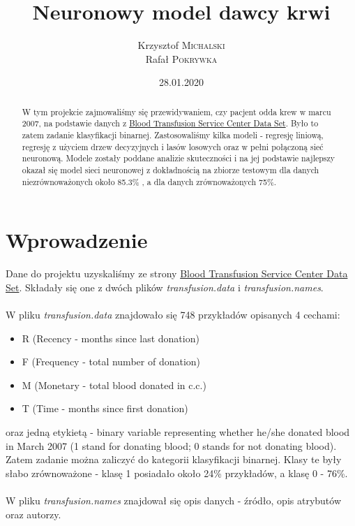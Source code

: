 \documentclass[11pt, a4paper, notitlepage]{report}
\author{Krzysztof \textsc{Michalski} \\ Rafał \textsc{Pokrywka} }
\title{\textbf{Neuronowy model dawcy krwi}}
\date{28.01.2020}
\begin{document}
\clearpage\maketitle
\thispagestyle{empty}
\begin{abstract}
	W tym projekcie zajmowaliśmy się przewidywaniem, czy pacjent odda krew w marcu 2007, na podstawie danych z \href{https://archive.ics.uci.edu/ml/datasets/Blood+Transfusion+Service+Center/}{Blood Transfusion Service Center Data Set}.
	Było to zatem zadanie klasyfikacji binarnej. Zastosowaliśmy kilka modeli - regresję liniową, regresję z użyciem drzew decyzyjnych i lasów losowych oraz w pełni połączoną sieć neuronową. Modele zostały poddane analizie skuteczności i na jej podstawie
	najlepszy okazał się model sieci neuronowej z dokładnością na zbiorze testowym dla danych niezrównoważonych około 85.3\% , a dla danych zrównoważonych 75\%.
\end{abstract}

\clearpage \tableofcontents
\thispagestyle{empty}

\setcounter{page}{1}

\chapter{Wprowadzenie}
	Dane do projektu uzyskaliśmy ze strony \href{https://archive.ics.uci.edu/ml/datasets/Blood+Transfusion+Service+Center/}{Blood Transfusion Service Center Data Set}. Składały się one z dwóch plików {\it transfusion.data} i {\it transfusion.names}.\\ \\
	W pliku  {\it transfusion.data} znajdowało się 748 przykładów opisanych 4 cechami:
	\begin{itemize}
	  \item R (Recency - months since last donation)
	  \item F (Frequency - total number of donation)
	  \item M (Monetary - total blood donated in c.c.)
	 \item T (Time - months since first donation)
	\end{itemize} oraz jedną etykietą - binary variable representing whether he/she donated blood in March 2007 (1 stand for donating blood; 0 stands for not donating blood). Zatem zadanie można zaliczyć do kategorii klasyfikacji binarnej. Klasy te były słabo zrównoważone - klasę 1
	posiadało około 24\% przykładów, a klasę 0 - 76\%.\\ \\
	W pliku {\it transfusion.names} znajdował się opis danych - źródło, opis atrybutów oraz autorzy.
\end{document}
